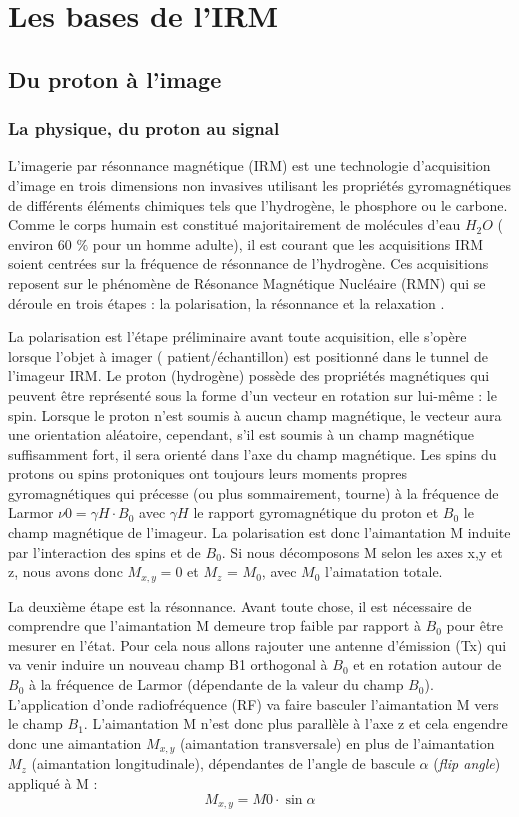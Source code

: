 \section{Les bases de l'IRM}
\subsection{Du proton à l’image}
\subsubsection{La physique, du proton au signal}

L’imagerie par résonnance magnétique (IRM) est une technologie d’acquisition d’image en trois dimensions non invasives utilisant les propriétés gyromagnétiques de différents éléments chimiques tels que l’hydrogène, le phosphore ou le carbone. Comme le corps humain est constitué majoritairement de molécules d’eau $H_2O$ ( environ 60 $\%$ pour un homme adulte), il est courant que les acquisitions IRM soient centrées sur la fréquence de résonnance de l’hydrogène. Ces acquisitions reposent sur le phénomène de Résonance Magnétique Nucléaire (RMN) qui se déroule en trois étapes : la polarisation, la résonnance et la relaxation \cite{HolgerFrsterling2009}.

La polarisation est l’étape préliminaire avant toute acquisition, elle s’opère lorsque l’objet à imager ( patient/échantillon) est positionné dans le tunnel de l’imageur IRM. Le proton (hydrogène) possède des propriétés magnétiques qui peuvent être représenté sous la forme d’un vecteur en rotation sur lui-même : le spin. Lorsque le proton n’est soumis à aucun champ magnétique, le vecteur aura une orientation aléatoire, cependant, s’il est soumis à un champ magnétique suffisamment fort, il sera orienté dans l’axe du champ magnétique. Les spins du protons ou spins protoniques ont toujours leurs moments propres gyromagnétiques qui précesse (ou plus sommairement, tourne) à la fréquence de Larmor $\nu 0 =\gamma H \cdot B_0 $ avec $\gamma H$ le rapport gyromagnétique du proton et $B_0$ le champ magnétique de l’imageur. La polarisation est donc l’aimantation M induite par l’interaction des spins et de $B_0$. Si nous décomposons M selon les axes x,y et z, nous avons donc $M_{x,y} = 0$ et $M_z$ = $M_0$, avec $M_0$ l’aimatation totale.

La deuxième étape est la résonnance. Avant toute chose, il est nécessaire de comprendre que l’aimantation M demeure trop faible  par rapport à $B_0$ pour être mesurer en l’état. Pour cela nous allons rajouter une antenne d’émission (Tx) qui va venir induire un nouveau champ B1 orthogonal à $B_0$ et en rotation autour de $B_0$ à la fréquence de Larmor (dépendante de la valeur du champ $B_0$).  L’application d’onde radiofréquence (RF) va faire basculer l’aimantation M vers le champ $B_1$. L’aimantation M n’est donc plus parallèle à l’axe z et cela engendre donc une aimantation $M_{x,y}$ (aimantation transversale) en plus de l’aimantation $M_z$ (aimantation longitudinale), dépendantes de l’angle de bascule $\alpha$ (\textit{flip angle}) appliqué à M :
\begin{equation}
\nonumber
	M_{x,y} = M0 \cdot \sin{\alpha}
\end{equation}

